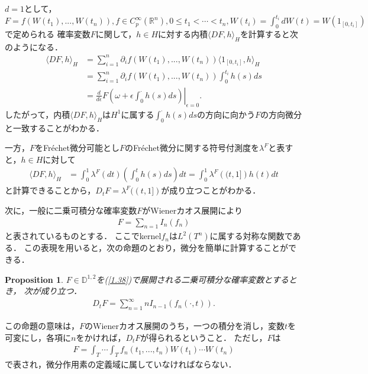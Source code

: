 \documentclass[a4paper,10pt]{jsarticle}
\theoremstyle{plain}
\newtheorem{proposition}{Proposition}
\newcommand{\eq}[1]{\begin{align}#1\end{align}}
\begin{document}
$d=1$として，$F=f(W(t_1),...,W(t_n)), f\in C^\infty_p(\mathbb{R}^n),0\le t_1<\cdots<t_n,W(t_i)=\int_0^{t_i}dW(t)=W(1_{[0,t_i]})$で定められる
確率変数$F$に関して，$h\in H$に対する内積$\langle DF,h\rangle_H$を計算すると次のようになる．
\eq{\langle DF,h\rangle_H
	&=\sum_{i=1}^n\partial_if(W(t_1),...,W(t_n))\langle 1_{[0,t_i]},h\rangle_H\\
	&=\sum_{i=1}^n\partial_if(W(t_1),...,W(t_n))\int_0^{t_i}h(s)ds\\
	&=\left.\frac{d}{d\epsilon}F\left(\omega+\epsilon\int_0^\cdot h(s)ds\right)\right|_{\epsilon=0}.}
したがって，内積$\langle DF,h\rangle_H$は$H^1$に属する$\int_0^\cdot h(s)ds$の方向に向かう$F$の方向微分と一致することがわかる．

一方，$F$をFr\'echet微分可能とし$F$のFr\'echet微分に関する符号付測度を$\lambda^F$と表すと，$h\in H$に対して
\eq{\langle DF,h\rangle_H
	&=\int_0^1\lambda^F(dt)\left(\int_0^th(s)ds\right)dt
	=\int_0^1\lambda^F\left((t,1]\right)h(t)dt}
と計算できることから，$D_tF=\lambda^F((t,1])$が成り立つことがわかる．

次に，一般に二乗可積分な確率変数$F$がWienerカオス展開により
\eq{F=\sum_{n=1}I_n(f_n)\label{1.38}}
と表されているものとする．
ここでkernel$f_n$は$L^2(T^n)$に属する対称な関数である．
この表現を用いると，次の命題のとおり，微分を簡単に計算することができる．
\begin{proposition}\label{prop1.2.7}
$F\in\mathbb{D}^{1,2}$を(\ref{1.38})で展開される二乗可積分な確率変数とするとき， 次が成り立つ．
\eq{D_tF=\sum^\infty_{n=1}nI_{n-1}\left(f_n(\cdot,t)\right).}
\end{proposition}
この命題の意味は，$F$のWienerカオス展開のうち，一つの積分を消し，変数$t$を可変にし，各項に$n$をかければ，$D_tF$が得られるということ．
ただし，$F$は
\eq{F=\int_T\cdots\int_Tf_n(t_1,...,t_n)W(t_1)\cdots W(t_n)}
で表され，微分作用素の定義域に属していなければならない．

\end{document}
